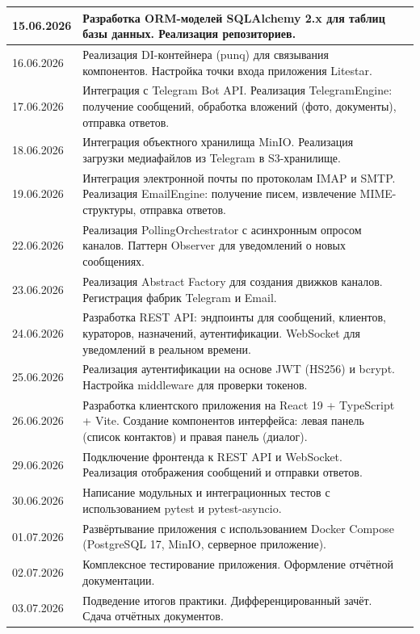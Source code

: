 \documentclass[12pt,a4paper]{report}
\begin{document}
\begin{tabularx}{\textwidth}{|p{2.2cm}|X|c|}
\hline
15.06.2026 & Разработка ORM-моделей SQLAlchemy 2.x для таблиц базы данных. Реализация репозиториев. & \\
\hline
16.06.2026 & Реализация DI-контейнера (punq) для связывания компонентов. Настройка точки входа приложения Litestar. & \\
\hline
17.06.2026 & Интеграция с Telegram Bot API. Реализация TelegramEngine: получение сообщений, обработка вложений (фото, документы), отправка ответов. & \\
\hline
18.06.2026 & Интеграция объектного хранилища MinIO. Реализация загрузки медиафайлов из Telegram в S3-хранилище. & \\
\hline
19.06.2026 & Интеграция электронной почты по протоколам IMAP и SMTP. Реализация EmailEngine: получение писем, извлечение MIME-структуры, отправка ответов. & \\
\hline
22.06.2026 & Реализация PollingOrchestrator с асинхронным опросом каналов. Паттерн Observer для уведомлений о новых сообщениях. & \\
\hline
23.06.2026 & Реализация Abstract Factory для создания движков каналов. Регистрация фабрик Telegram и Email. & \\
\hline
24.06.2026 & Разработка REST API: эндпоинты для сообщений, клиентов, кураторов, назначений, аутентификации. WebSocket для уведомлений в реальном времени. & \\
\hline
25.06.2026 & Реализация аутентификации на основе JWT (HS256) и bcrypt. Настройка middleware для проверки токенов. & \\
\hline
26.06.2026 & Разработка клиентского приложения на React 19 + TypeScript + Vite. Создание компонентов интерфейса: левая панель (список контактов) и правая панель (диалог). & \\
\hline
29.06.2026 & Подключение фронтенда к REST API и WebSocket. Реализация отображения сообщений и отправки ответов. & \\
\hline
30.06.2026 & Написание модульных и интеграционных тестов с использованием pytest и pytest-asyncio. & \\
\hline
01.07.2026 & Развёртывание приложения с использованием Docker Compose (PostgreSQL 17, MinIO, серверное приложение). & \\
\hline
02.07.2026 & Комплексное тестирование приложения. Оформление отчётной документации. & \\
\hline
03.07.2026 & Подведение итогов практики. Дифференцированный зачёт. Сдача отчётных документов. & \\
\hline
\end{tabularx}
\end{document}
